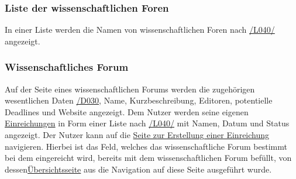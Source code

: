 \subsubsection{Liste der wissenschaftlichen Foren}
\begin{description}
     In einer Liste werden die Namen von wissenschaftlichen Foren nach \hyperref[leist:40]{/L040/}
    angezeigt.
\end{description}

\subsubsection{Wissenschaftliches Forum}\label{nut:wissFor}
\begin{description}
     Auf der Seite eines wissenschaftlichen Forums werden die zugehörigen wesentlichen Daten \hyperref[d030]{/D030},
    Name, Kurzbeschreibung, Editoren, potentielle Deadlines und Website angezeigt.
     Dem Nutzer werden seine eigenen \hyperref[nut:ein]{Einreichungen} in Form einer Liste  nach \hyperref[leist:40]{/L040/}
    mit Namen, Datum und Status angezeigt.
     Der Nutzer kann auf die \hyperref[nut:eein]{Seite zur Erstellung einer Einreichung} navigieren. Hierbei ist
    das Feld, welches das wissenschaftliche Forum bestimmt bei dem eingereicht wird, bereits mit
    dem wissenschaftlichen Forum befüllt, von dessen\hyperref[nut:wissFor]{Übersichtsseite} aus die Navigation auf diese
    Seite ausgeführt wurde.
\end{description}

